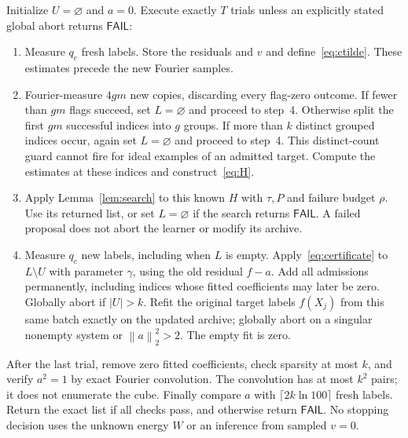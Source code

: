 \documentclass[11pt]{article}
\theoremstyle{remark}\newtheorem{remark}[theorem]{Remark}
\newcommand{\FAIL}{\mathsf{FAIL}}
\newcommand{\norm}[1]{\left\|#1\right\|}
\begin{document}
Initialize $U=\varnothing$ and $a=0$. Execute exactly $T$ trials unless an explicitly stated global abort returns $\FAIL$:
\begin{enumerate}
\item Measure $q_e$ fresh labels. Store the residuals and $v$ and define~\eqref{eq:ctilde}. These estimates precede the new Fourier samples.
\item Fourier-measure $4gm$ new copies, discarding every flag-zero outcome. If fewer than $gm$ flags succeed, set $L=\varnothing$ and proceed to step~4. Otherwise split the first $gm$ successful indices into $g$ groups. If more than $k$ distinct grouped indices occur, again set $L=\varnothing$ and proceed to step~4. This distinct-count guard cannot fire for ideal examples of an admitted target. Compute the estimates at these indices and construct~\eqref{eq:H}.
\item Apply Lemma~\ref{lem:search} to this known $H$ with $\tau,P$ and failure budget $\rho$. Use its returned list, or set $L=\varnothing$ if the search returns $\FAIL$. A failed proposal does not abort the learner or modify its archive.
\item Measure $q_c$ new labels, including when $L$ is empty. Apply~\eqref{eq:certificate} to $L\setminus U$ with parameter $\gamma$, using the old residual $f-a$. Add all admissions permanently, including indices whose fitted coefficients may later be zero. Globally abort if $|U|>k$. Refit the original target labels $f(X_j)$ from this same batch exactly on the updated archive; globally abort on a singular nonempty system or $\norm a_2^2>2$. The empty fit is zero.
\end{enumerate}
After the last trial, remove zero fitted coefficients, check sparsity at most $k$, and verify $a^2=1$ by exact Fourier convolution. The convolution has at most $k^2$ pairs; it does not enumerate the cube. Finally compare $a$ with $\lceil2k\ln100\rceil$ fresh labels. Return the exact list if all checks pass, and otherwise return $\FAIL$. No stopping decision uses the unknown energy $W$ or an inference from sampled $v=0$.
\end{document}
